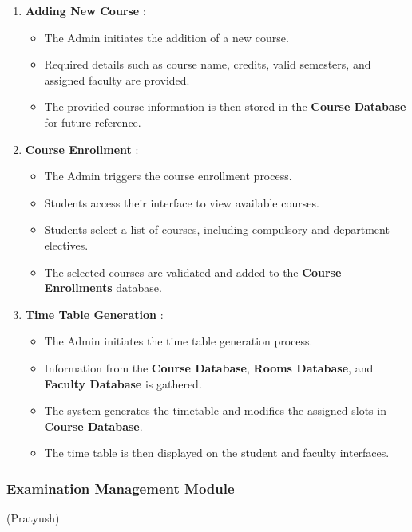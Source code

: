 \documentclass[12pt,a4paper]{article}
\begin{document}
\begin{enumerate}
	\item \textbf{Adding New Course} : 
		\begin{itemize}
			\item The Admin initiates the addition of a new course.
			\item Required details such as course name, credits, valid semesters, and assigned faculty are provided.
			\item The provided course information is then stored in the \textbf{Course Database} for future reference.
		\end{itemize}
	\item \textbf{Course Enrollment} :
		\begin{itemize}
			\item The Admin triggers the course enrollment process.
			\item Students access their interface to view available courses.
			\item Students select a list of courses, including compulsory and department electives.
			\item The selected courses are validated and added to the \textbf{Course Enrollments} database.
		\end{itemize}
	\item \textbf{Time Table Generation} :
		\begin{itemize}
			\item The Admin initiates the time table generation process.
			\item Information from the \textbf{Course Database}, \textbf{Rooms Database}, and \textbf{Faculty Database} is gathered.
			\item The system generates the timetable and modifies the assigned slots in \textbf{Course Database}.
			\item The time table is then displayed on the student and faculty interfaces.
		\end{itemize}
	
\end{enumerate}

\subsubsection{Examination Management Module}
(Pratyush)
\end{document}

